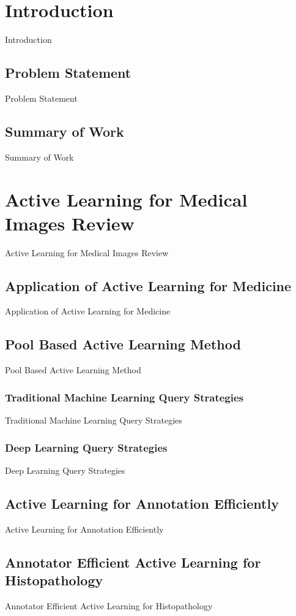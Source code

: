 \section{Introduction}
Introduction

\subsection{Problem Statement}
Problem Statement

\subsection{Summary of Work}
Summary of Work



\section{Active Learning for Medical Images Review}
Active Learning for Medical Images Review

\subsection{Application of Active Learning for Medicine}
Application of Active Learning for Medicine

\subsection{Pool Based Active Learning Method}
Pool Based Active Learning Method 

\subsubsection{Traditional Machine Learning Query Strategies}
Traditional Machine Learning Query Strategies

\subsubsection{Deep Learning Query Strategies}
Deep Learning Query Strategies

\subsection{Active Learning for Annotation Efficiently}
Active Learning for Annotation Efficiently

\subsection{Annotator Efficient Active Learning for Histopathology}
Annotator Efficient Active Learning for Histopathology



